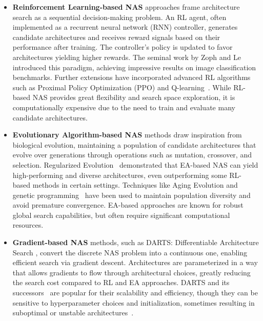 \begin{itemize}
    \item \textbf{Reinforcement Learning-based NAS} approaches frame architecture search as a sequential decision-making problem. An RL agent, often implemented as a recurrent neural network (RNN) controller, generates candidate architectures and receives reward signals based on their performance after training. The controller's policy is updated to favor architectures yielding higher rewards. The seminal work by Zoph and Le~\cite{zoph2016neural} introduced this paradigm, achieving impressive results on image classification benchmarks. Further extensions have incorporated advanced RL algorithms such as Proximal Policy Optimization (PPO) and Q-learning~\cite{baker2016designing,pham2018efficient}. While RL-based NAS provides great flexibility and search space exploration, it is computationally expensive due to the need to train and evaluate many candidate architectures.
    
    \item \textbf{Evolutionary Algorithm-based NAS} methods draw inspiration from biological evolution, maintaining a population of candidate architectures that evolve over generations through operations such as mutation, crossover, and selection. Regularized Evolution~\cite{real2019regularized} demonstrated that EA-based NAS can yield high-performing and diverse architectures, even outperforming some RL-based methods in certain settings. Techniques like Aging Evolution and genetic programming~\cite{liu2017hierarchical,xie2017genetic} have been used to maintain population diversity and avoid premature convergence. EA-based approaches are known for robust global search capabilities, but often require significant computational resources.
    
    \item \textbf{Gradient-based NAS} methods, such as DARTS: Differentiable Architecture Search \cite{liu2018darts}, convert the discrete NAS problem into a continuous one, enabling efficient search via gradient descent. Architectures are parameterized in a way that allows gradients to flow through architectural choices, greatly reducing the search cost compared to RL and EA approaches. DARTS and its successors~\cite{cai2018proxylessnas,chen2019progressive} are popular for their scalability and efficiency, though they can be sensitive to hyperparameter choices and initialization, sometimes resulting in suboptimal or unstable architectures~\cite{zela2019understanding}.
\end{itemize}

